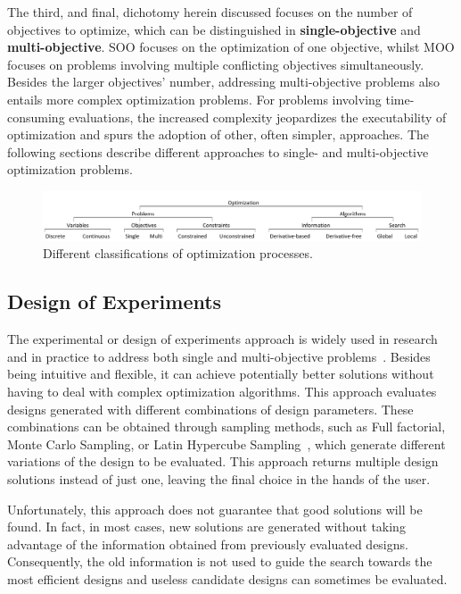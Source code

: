 	The third, and final, dichotomy herein discussed focuses on the number of objectives to optimize, which can be distinguished in \textbf{single-objective} and \textbf{multi-objective}. \ac{SOO} focuses on the optimization of one objective, whilst \ac{MOO} focuses on problems involving multiple conflicting objectives simultaneously. Besides the larger objectives' number, addressing multi-objective problems also entails more complex optimization problems. For problems involving time-consuming evaluations, the increased complexity jeopardizes the executability of optimization and spurs the adoption of other, often simpler, approaches. The following sections describe different approaches to single- and multi-objective optimization problems. 
	
	\begin{figure}
		\centering
		\includegraphics[width=\textwidth]{Images/Background/opt-classifications-h.PNG}
		\caption{Different classifications of optimization processes.}
		\label{fig:optclassification}
	\end{figure}
	
	\subsection{Design of Experiments}
	\label{ssec:doe}
	
	The experimental or design of experiments approach is widely used in research and in practice to address both single and multi-objective problems~\cite{Fang2017}. Besides being intuitive and flexible, it can achieve potentially better solutions without having to deal with complex optimization algorithms. This approach evaluates designs generated with different combinations of design parameters. These combinations can be obtained through sampling methods, such as Full factorial, Monte Carlo Sampling, or Latin Hypercube Sampling~\cite{Giunta2003DOE}, which generate different variations of the design to be evaluated. This approach returns multiple design solutions instead of just one, leaving the final choice in the hands of the user.
	
	Unfortunately, this approach does not guarantee that good solutions will be found. In fact, in most cases, new solutions are generated without taking advantage of the information obtained from previously evaluated designs. Consequently, the old information is not used to guide the search towards the most efficient designs and useless candidate designs can sometimes be evaluated. 
	
